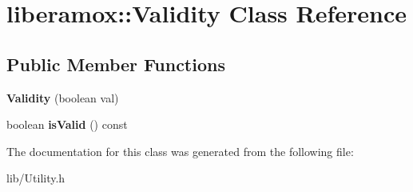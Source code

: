 \hypertarget{classliberamox_1_1Validity}{}\section{liberamox\+:\+:Validity Class Reference}
\label{classliberamox_1_1Validity}
\subsection*{Public Member Functions}
\begin{DoxyCompactItemize}
\item 
{\bfseries Validity} (boolean val)\hypertarget{classliberamox_1_1Validity_a43adbc17958ae0420dc28609aae57a5a}{}\label{classliberamox_1_1Validity_a43adbc17958ae0420dc28609aae57a5a}

\item 
boolean {\bfseries is\+Valid} () const \hypertarget{classliberamox_1_1Validity_a1221e8832050930cc291da6261d7833a}{}\label{classliberamox_1_1Validity_a1221e8832050930cc291da6261d7833a}

\end{DoxyCompactItemize}


The documentation for this class was generated from the following file\+:\begin{DoxyCompactItemize}
\item 
lib/Utility.\+h\end{DoxyCompactItemize}
